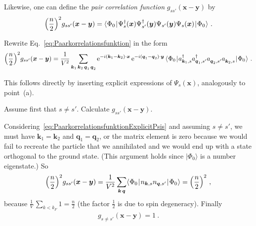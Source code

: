 \documentclass[11pt,a4paper]{article}
\newcommand{\ee}{{\mathrm{e}}}
\newcommand{\ket}[1]{\lvert#1\rangle}
\newcommand{\matrixel}[3]{\langle\hspace{0.15mm}#1\hspace{0.25mm}\vert\hspace{0.25mm} #2 \hspace{0.25mm}\vert\hspace{0.25mm}#3\hspace{0.15mm}\rangle}
\newcommand{\boldx}{{\boldsymbol x}}
\newcommand{\boldy}{{\boldsymbol y}}
\newcommand{\boldk}{{\boldsymbol k}}
\newcommand{\boldq}{{\boldsymbol q}}
\newcommand{\nodagger}{{\vphantom{\dagger}}} %
\begin{document}
\begin{exenumerate}
\begin{loesung}
  \end{loesung}
\end{exenumerate}

Likewise, one can define the {\em pair correlation function} $g_{ss'}(\boldx-\boldy)$ by
\begin{align}
  \label{eq:Paarkorrelationsfunktion}
  \Bigl(\frac{n}{2}\Bigr)^2 g_{ss'}(\boldx-\boldy)
  = \matrixel{\Phi_0}{\Psi_s^\dagger(\boldx) \Psi_{s'}^\dagger(\boldy) \Psi_{s'}(\boldy)\Psi_s(\boldx)}{\Phi_0}\ .
\end{align}

\begin{exenumerate}
\item Rewrite Eq.~\eqref{eq:Paarkorrelationsfunktion} in the form
  \begin{align}
    \label{eq:PaarkorrelationsfunktionExplicitPsis}
    \Bigl(\frac{n}{2}\Bigr)^2 g_{ss'}(\boldx-\boldy)
    = \frac1{V^2}\sum_{\boldk_1\,\boldk_2\,\boldq_1\,\boldq_2}
    \ee^{-i\left(\boldk_1-\boldk_2\right)\cdot\boldx}\, \ee^{-i\left(\boldq_1-\boldq_2\right)\cdot\boldy}\,
    \matrixel{\Phi_0}{a^\dagger_{\boldk_1,s} a^\dagger_{\boldq_1,s'}
      a^\nodagger_{\boldq_2,s'} a^\nodagger_{\boldk_2,s} }{\Phi_0}\ .
  \end{align}

  \begin{loesung}
    This follows directly by inserting explicit expressions of $\Psi_s(\boldx)$, analogously to point~(a).
  \end{loesung}
  
\item Assume first that $s\neq s'$. Calculate $g_{ss'}(\boldx-\boldy)$.
  
  \begin{loesung}
    Considering~\eqref{eq:PaarkorrelationsfunktionExplicitPsis} and assuming $s\neq s'$, we must
    have $\boldk_1=\boldk_2$
    and $\boldq_1 = \boldq_2$, or the matrix element is zero because we would fail to recreate the particle
    that we annihilated and we would end up with a state orthogonal to the ground state. (This argument holds
    since $\ket{\Phi_0}$ is a number eigenstate.) So
    \begin{align}
      \Bigl(\frac{n}{2}\Bigr)^2 g_{ss'}(\boldx-\boldy)
      = \frac1{V^2}\sum_{\boldk\,\boldq}\matrixel{\Phi_0}{n_{\boldk,s} n_{\boldq,s'}}{\Phi_0}
      = \Bigl(\frac{n}{2}\Bigr)^2\ ,
    \end{align}
    because $\frac{1}{V}\,\sum_{k<k_F}1 = \frac{n}{2}$ (the factor $\frac12$ is due to spin degeneracy).
    Finally
    \begin{align}
      g_{s\neq s'}\left(\boldx-\boldy\right) = 1\ .
    \end{align}
  \end{loesung}
  

\end{exenumerate}
\end{document}
